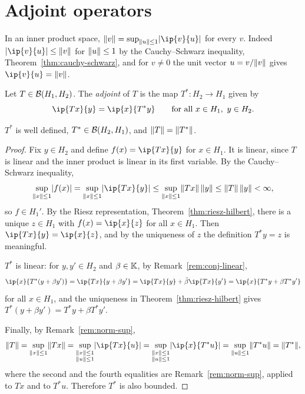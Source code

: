 \section{Adjoint operators}

\begin{remark}\label{rem:norm-sup}
In an inner product space, $\norm{v} = \sup_{\norm{u} \le 1} \abs{\ip{v}{u}}$
for every $v$. Indeed $\abs{\ip{v}{u}} \le \norm{v}$ for $\lVert u\rVert \le 1$ by
the Cauchy--Schwarz inequality, Theorem~\ref{thm:cauchy-schwarz}, and for
$v \ne 0$ the unit vector $u = v / \lVert v\rVert$ gives $\ip{v}{u} = \norm{v}$.
\end{remark}

\begin{definition}\label{def:adjoint}
Let $T \in \mathcal{B}(H_1, H_2)$. The \emph{adjoint} of $T$ is the map
$T^* \colon H_2 \to H_1$ given by
\[
  \ip{Tx}{y} = \ip{x}{T^* y} \qquad \text{for all } x \in H_1,\ y \in H_2 .
\]
\end{definition}

\begin{theorem}\label{thm:adjoint}
$T^*$ is well defined, $T^* \in \mathcal{B}(H_2, H_1)$, and $\lVert T\rVert = \lVert T^*\rVert$.
\end{theorem}

\begin{proof}
Fix $y \in H_2$ and define $f(x) = \ip{Tx}{y}$ for $x \in H_1$. It is linear,
since $T$ is linear and the inner product is linear in its first variable.
By the Cauchy--Schwarz inequality,
\[
  \sup_{\norm{x} \le 1} \abs{f(x)} = \sup_{\norm{x} \le 1} \abs{\ip{Tx}{y}}
  \le \sup_{\norm{x} \le 1} \norm{Tx}\,\norm{y}
  \le \norm{T}\,\norm{y} < \infty ,
\]
so $f \in H_1'$. By the Riesz representation, Theorem~\ref{thm:riesz-hilbert},
there is a unique $z \in H_1$ with $f(x) = \ip{x}{z}$ for all $x \in H_1$.
Then $\ip{Tx}{y} = \ip{x}{z}$, and by the uniqueness of $z$ the definition
$T^* y = z$ is meaningful.

$T^*$ is linear: for $y, y' \in H_2$ and $\beta \in \mathbb{K}$, by
Remark~\ref{rem:conj-linear},
\[
  \ip{x}{T^*(y + \beta y')} = \ip{Tx}{y + \beta y'}
  = \ip{Tx}{y} + \bar{\beta}\ip{Tx}{y'}
  = \ip{x}{T^* y + \beta T^* y'}
\]
for all $x \in H_1$, and the uniqueness in Theorem~\ref{thm:riesz-hilbert}
gives $T^*(y + \beta y') = T^* y + \beta T^* y'$.

Finally, by Remark~\ref{rem:norm-sup},
\[
  \norm{T} = \sup_{\norm{x} \le 1} \norm{Tx}
  = \sup_{\substack{\norm{x} \le 1\\ \norm{u} \le 1}} \abs{\ip{Tx}{u}}
  = \sup_{\substack{\norm{x} \le 1\\ \norm{u} \le 1}} \abs{\ip{x}{T^* u}}
  = \sup_{\norm{u} \le 1} \norm{T^* u} = \norm{T^*} ,
\]
where the second and the fourth equalities are Remark~\ref{rem:norm-sup},
applied to $Tx$ and to $T^* u$. Therefore $T^*$ is also bounded.
\end{proof}

